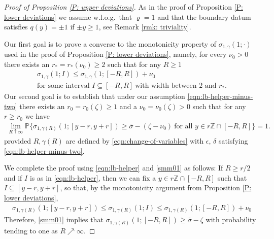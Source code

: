 \documentclass[12pt]{amsart}
\begin{document}
\begin{proof}[Proof of Proposition \ref{P: upper deviations}]
		
			As in the proof of Proposition \ref{P: lower deviations} we assume w.l.o.g.~that $ \varrho = 1 $ and that the boundary datum satisfies $ q ( y ) = \pm 1 $ if $ \pm y \geq 1 $, see Remark \ref{rmk: triviality}.
			
			Our first goal is to prove a converse to the monotonicity property of $  \sigma_{ 1 , \gamma } ( 1;  \cdot )  $ used in the proof of Proposition \ref{P: lower deviations}, namely, for every $ \nu_{0} > 0 $ there exists an $ r_{*} = r_{*} ( \nu_{0} )  \geq 2 $ such that for any $ R \geq 1 $
			\begin{gather}
				\sigma_{ 1 , \gamma } ( 1; I ) \leq \sigma_{ 1 , \gamma } ( 1; [ - R , R ] ) + \nu_{0} \label{eqn:lb-helper} \\
				\text{for some interval } I \subseteq [ -R, R ] ~ \text{with width between } 2 \text{ and }  r_{*} . \nonumber
			\end{gather}
			Our second goal is to establish that under our assumption \eqref{eqn:lb-helper-minus-two} there exists an $ r_0 = r_0 ( \zeta ) \geq 1 $ and a $\nu_{0} = \nu_{0} ( \zeta ) > 0$ such that for any $ r \geq r_0 $ we have
			\begin{align}\label{smm01}
				\lim_{ R \uparrow \infty } \mathbb{P} \big\{  \sigma_{ 1 , \gamma(R) } ( 1;  [ y - r , y + r ] ) \geq \bar{\sigma} - (\zeta - \nu_{0}) ~ \text{for all} \, \, y \in r \mathbb{Z} \cap  [- R  , R ] \big\} = 1 .
			\end{align}
			provided $ R, \gamma(R) $ are defined by \eqref{eqn:change-of-variables} with $ \epsilon $, $ \delta $ satisfying \eqref{eqn:lb-helper-minus-two}. 
			
			We complete the proof using \eqref{eqn:lb-helper} and \eqref{smm01} as follows: If $R \geq r/2$ and if $I$ is as in \eqref{eqn:lb-helper}, then we can fix a $y \in r \mathbb{Z} \cap [-R,R]$ such that $ I \subseteq [ y - r , y + r ] $, so that, by the monotonicity argument from Proposition \ref{P: lower deviations},
				\begin{align*}
					\sigma_{1,\gamma(R)}(1;[y-r,y+r]) \leq \sigma_{1,\gamma(R)}(1;I) \leq \sigma_{1,\gamma(R)}(1;[-R,R]) + \nu_{0}
				\end{align*}
		Therefore, \eqref{smm01} implies that $\sigma_{1,\gamma(R)}(1;[-R,R]) \geq \bar{\sigma} - \zeta$ with probability tending to one as $R \nearrow \infty$.
			

\end{proof}
\end{document}

